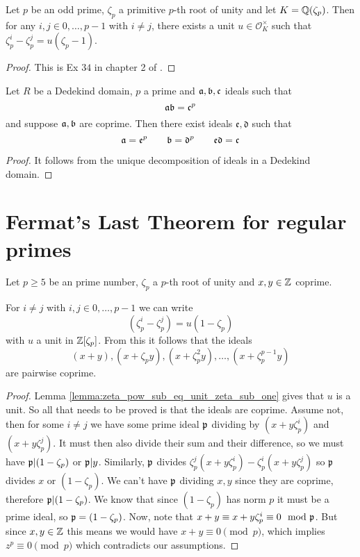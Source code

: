 \begin{lemma}\label{lemma:zeta_pow_sub_eq_unit_zeta_sub_one}
	\leanok
	Let $p$ be an odd prime, $\zeta_p$ a primitive $p$-th root of unity and let $K=\mathbb{Q}(\zeta_p)$. Then for any $i,j \in {0,\dots,p-1}$ with $i \ne j$, there exists a unit $u \in \mathcal{O}_K^\times$ such that $\zeta_p^i-\zeta_p^j = u  (\zeta_p-1)$.
\end{lemma}
\begin{proof}
	\leanok
	This is Ex $34$ in chapter 2 of \cite{marcus}.
\end{proof}


\begin{lemma}\label{lemma:ideals_mult_to_power}
	\leanok
	Let $R$ be a Dedekind domain, $p$ a prime and $\mathfrak{a},\mathfrak{b},\mathfrak{c}$ ideals such that \[\mathfrak{a}\mathfrak{b}=\mathfrak{c}^p\] and suppose $\mathfrak{a},\mathfrak{b}$ are coprime. Then there exist ideals $\mathfrak{e},\mathfrak{d}$ such that \[\mathfrak{a}=\mathfrak{e}^p \qquad \mathfrak{b}=\mathfrak{d}^p \qquad \mathfrak{e}\mathfrak{d}=\mathfrak{c}\]
\end{lemma}
\begin{proof}
	\leanok
	It follows from the unique decomposition of ideals in a Dedekind domain.
\end{proof}


\section{Fermat's Last Theorem for regular primes}

\begin{lemma}\label{lem:flt_ideals_coprime}
	\leanok
	Let $p \geq 5$ be an prime number, $\zeta_p$ a $p$-th root of unity and $x, y \in \mathbb{Z}$ coprime.

	For $i \neq j$ with $i,j \in {0,\dots,p-1}$ we can write \[(\zeta_p^i-\zeta_p^j)=u(1-\zeta_p)\] with $u$ a unit in $\mathbb{Z}[\zeta_p]$. From this it follows that the ideals \[(x+y),(x+\zeta_py),(x+\zeta_p^2y),\dots,(x+\zeta_p^{p-1}y)\] are pairwise coprime.
\end{lemma}
\begin{proof}
	\leanok
	 Lemma \ref{lemma:zeta_pow_sub_eq_unit_zeta_sub_one} gives that $u$ is a unit. So all that needs to be proved is that the ideals are coprime. Assume not, then for some $i \neq j$ we have some prime ideal $\mathfrak{p}$ dividing by $(x+y\zeta_p^i)$ and $(x+y\zeta_p^j)$. It must then also divide their sum and their difference, so we must have $\mathfrak{p} | (1-\zeta_p)$ or $\mathfrak{p} | y$. Similarly, $\mathfrak{p}$ divides $\zeta_p^j(x+y\zeta_p^i)-\zeta_p^i(x+y\zeta_p^j)$ so $\mathfrak{p}$ divides $x$ or $(1-\zeta_p)$. We can't have $\mathfrak{p}$ dividing $x,y$ since they are coprime, therefore $\mathfrak{p} |(1-\zeta_p)$. We know that since $(1-\zeta_p)$ has norm $p$ it must be a prime ideal, so $\mathfrak{p}=(1-\zeta_p)$. Now, note that $x+y \equiv x+y\zeta_p^i \equiv 0 \mod {\mathfrak{p}}$. But since $x,y \in \mathbb{Z}$ this means we would have $x+y \equiv 0 \pmod p$, which implies $z^p \equiv 0 \pmod p$ which contradicts our assumptions.
\end{proof}

